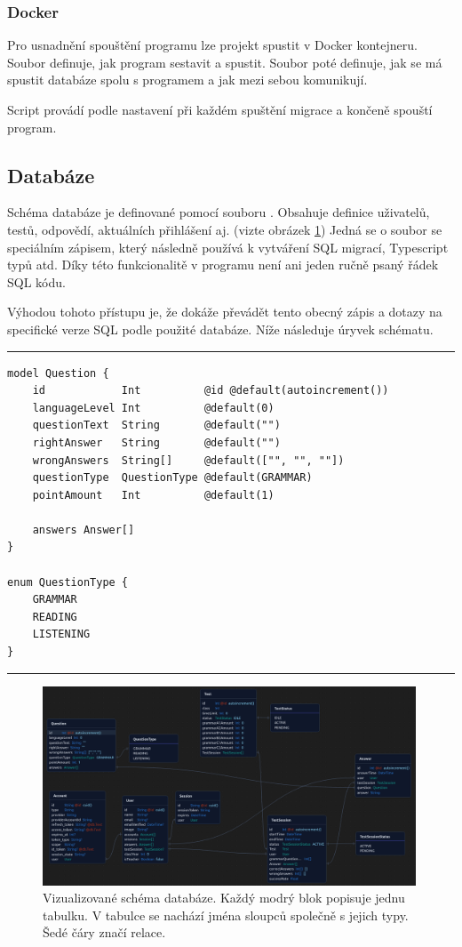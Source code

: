 \subsubsection{Docker}

Pro usnadnění spouštění programu lze projekt spustit v Docker kontejneru. Soubor  definuje, jak program sestavit a spustit. Soubor  poté definuje, jak se má spustit databáze spolu s programem a jak mezi sebou komunikují. \cite{docker}

Script  provádí podle nastavení při každém spuštění migrace a končeně spouští program.

\subsection{Databáze}

Schéma databáze je definované pomocí souboru . Obsahuje definice uživatelů, testů, odpovědí, aktuálních přihlášení aj. (vizte obrázek \ref{schema}) Jedná se o soubor se speciálním zápisem, který následně  používá k vytváření SQL migrací, Typescript typů atd. Díky této funkcionalitě v programu není ani jeden ručně psaný řádek SQL kódu.

Výhodou tohoto přístupu je, že  dokáže převádět tento obecný zápis a dotazy na specifické verze SQL podle použité databáze. \cite{prisma} Níže následuje úryvek schématu.

\indent

\hrule
\begin{verbatim}
model Question {
    id            Int          @id @default(autoincrement())
    languageLevel Int          @default(0)
    questionText  String       @default("")
    rightAnswer   String       @default("")
    wrongAnswers  String[]     @default(["", "", ""])
    questionType  QuestionType @default(GRAMMAR)
    pointAmount   Int          @default(1)

    answers Answer[]
}

enum QuestionType {
    GRAMMAR
    READING
    LISTENING
}
\end{verbatim}
\hrule

\begin{figure}[H]
    \centering
    \includegraphics[width=420px]{images/02technologie/schema.png}
    \caption{Vizualizované schéma databáze. Každý modrý blok popisuje jednu tabulku. V tabulce se nachází jména sloupců společně s jejich typy. Šedé čáry značí relace.}
    \label{schema}
\end{figure}

